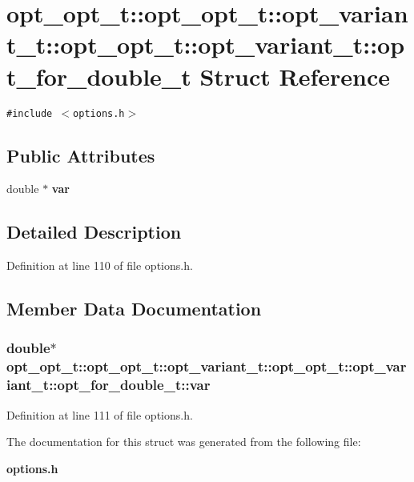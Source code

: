 \section{opt\_\-opt\_\-t::opt\_\-opt\_\-t::opt\_\-variant\_\-t::opt\_\-opt\_\-t::opt\_\-variant\_\-t::opt\_\-for\_\-double\_\-t Struct Reference}
\label{structopt__opt__t_1_1opt__variant__t_1_1opt__for__double__t}
{\tt \#include $<$options.h$>$}

\subsection*{Public Attributes}
\begin{CompactItemize}
\item 
double $\ast$ {\bf var}
\end{CompactItemize}


\subsection{Detailed Description}


Definition at line 110 of file options.h.

\subsection{Member Data Documentation}
\subsubsection[{var}]{\setlength{\rightskip}{0pt plus 5cm}double$\ast$ opt\_\-opt\_\-t::opt\_\-opt\_\-t::opt\_\-variant\_\-t::opt\_\-opt\_\-t::opt\_\-variant\_\-t::opt\_\-for\_\-double\_\-t::var}\label{structopt__opt__t_1_1opt__variant__t_1_1opt__for__double__t_2825df5de0136b74af9d4e0236a988f7}




Definition at line 111 of file options.h.

The documentation for this struct was generated from the following file:\begin{CompactItemize}
\item 
{\bf options.h}\end{CompactItemize}
